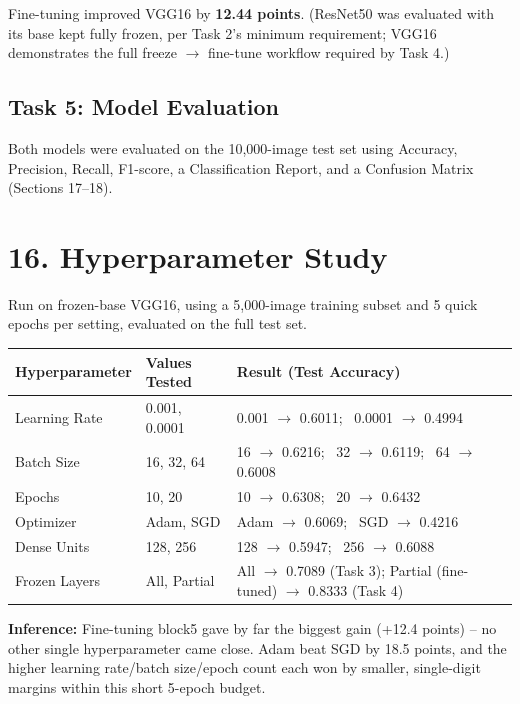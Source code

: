 \documentclass[11pt]{article}
\begin{document}
Fine-tuning improved VGG16 by \textbf{12.44 points}. (ResNet50 was
evaluated with its base kept fully frozen, per Task 2's minimum
requirement; VGG16 demonstrates the full freeze $\to$ fine-tune
workflow required by Task 4.)

\subsection*{Task 5: Model Evaluation}

Both models were evaluated on the 10,000-image test set using
Accuracy, Precision, Recall, F1-score, a Classification Report, and
a Confusion Matrix (Sections 17--18).

\section*{16. Hyperparameter Study}

Run on frozen-base VGG16, using a 5,000-image training subset and 5
quick epochs per setting, evaluated on the full test set.

\begin{center}
\begin{tabular}{|l|l|l|}
\hline
Hyperparameter & Values Tested & Result (Test Accuracy)\\
\hline
Learning Rate & 0.001, 0.0001 & 0.001 $\to$ 0.6011; \ 0.0001 $\to$ 0.4994\\
\hline
Batch Size & 16, 32, 64 & 16 $\to$ 0.6216; \ 32 $\to$ 0.6119; \ 64 $\to$ 0.6008\\
\hline
Epochs & 10, 20 & 10 $\to$ 0.6308; \ 20 $\to$ 0.6432\\
\hline
Optimizer & Adam, SGD & Adam $\to$ 0.6069; \ SGD $\to$ 0.4216\\
\hline
Dense Units & 128, 256 & 128 $\to$ 0.5947; \ 256 $\to$ 0.6088\\
\hline
Frozen Layers & All, Partial & All $\to$ 0.7089 (Task 3); Partial (fine-tuned) $\to$ 0.8333 (Task 4)\\
\hline
\end{tabular}
\end{center}

\textbf{Inference:} Fine-tuning block5 gave by far the biggest gain
(+12.4 points) -- no other single hyperparameter came close. Adam
beat SGD by 18.5 points, and the higher learning rate/batch size/epoch
count each won by smaller, single-digit margins within this short
5-epoch budget.
\end{document}
